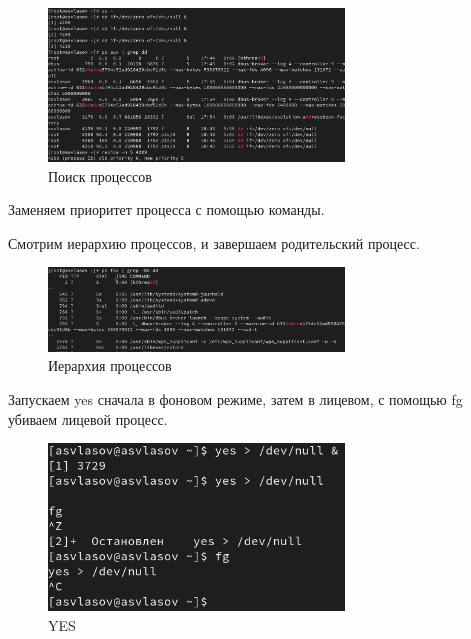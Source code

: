 \documentclass[
  12pt,
  a4paper,
  DIV=11,
  numbers=noendperiod]{scrreprt}
\begin{document}
\begin{figure}

{\centering \includegraphics[width=0.7\textwidth,height=\textheight]{image/6.png}

}

\caption{Поиск процессов}

\end{figure}%

Заменяем приоритет процесса с помощью команды.

Смотрим иерархию процессов, и завершаем родительский процесс.

\begin{figure}

{\centering \includegraphics[width=0.7\textwidth,height=\textheight]{image/7.png}

}

\caption{Иерархия процессов}

\end{figure}%

Запускаем yes сначала в фоновом режиме, затем в лицевом, с помощью fg
убиваем лицевой процесс.

\begin{figure}

{\centering \includegraphics[width=0.7\textwidth,height=\textheight]{image/8.png}

}

\caption{YES}

\end{figure}%
\end{document}
